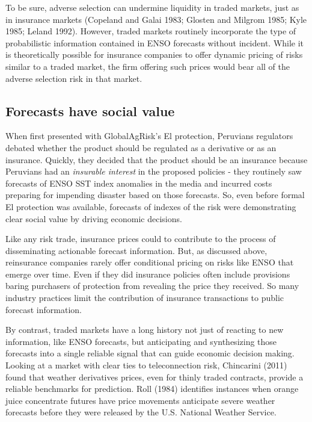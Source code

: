 \documentclass[article]{jss}
\begin{document}
To be sure, adverse selection can undermine liquidity in traded markets,
just as in insurance markets (Copeland and Galai 1983; Glosten and
Milgrom 1985; Kyle 1985; Leland 1992). However, traded markets routinely
incorporate the type of probabilistic information contained in ENSO
forecasts without incident. While it is theoretically possible for
insurance companies to offer dynamic pricing of risks similar to a
traded market, the firm offering such prices would bear all of the
adverse selection risk in that market.

\subsection{Forecasts have social
value}\label{forecasts-have-social-value}

When first presented with GlobalAgRisk's El  protection,
Peruvians regulators debated whether the product should be regulated as
a derivative or as an insurance. Quickly, they decided that the product
should be an insurance because Peruvians had an \emph{insurable
interest} in the proposed policies - they routinely saw forecasts of
ENSO SST index anomalies in the media and incurred costs preparing for
impending disaster based on those forecasts. So, even before formal El
 protection was available, forecasts of indexes of the risk
were demonstrating clear social value by driving economic decisions.

Like any risk trade, insurance prices could to contribute to the process
of disseminating actionable forecast information. But, as discussed
above, reinsurance companies rarely offer conditional pricing on risks
like ENSO that emerge over time. Even if they did insurance policies
often include provisions baring purchasers of protection from revealing
the price they received. So many industry practices limit the
contribution of insurance transactions to public forecast information.

By contrast, traded markets have a long history not just of reacting to
new information, like ENSO forecasts, but anticipating and synthesizing
those forecasts into a single reliable signal that can guide economic
decision making. Looking at a market with clear ties to teleconnection
risk, Chincarini (2011) found that weather derivatives prices, even for
thinly traded contracts, provide a reliable benchmarks for prediction.
Roll (1984) identifies instances when orange juice concentrate futures
have price movements anticipate severe weather forecasts before they
were released by the U.S. National Weather Service.
\end{document}
